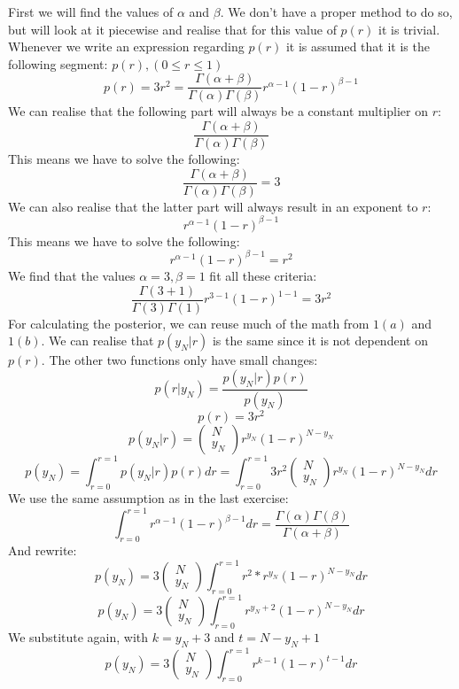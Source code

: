 First we will find the values of $\alpha$ and $\beta$. We don't have a proper method to do so, but will look at it piecewise and realise that for this value of $p(r)$ it is trivial. Whenever we write an expression regarding $p(r)$ it is assumed that it is the following segment: $p(r), (0 \leq r \leq 1)$
$$
p(r) = 3r^2 = \frac{\Gamma(\alpha + \beta)}{\Gamma(\alpha)\Gamma(\beta)} r^{\alpha-1}(1-r)^{\beta-1}
$$
We can realise that the following part will always be a constant multiplier on $r$:
$$
\frac{\Gamma(\alpha + \beta)}{\Gamma(\alpha)\Gamma(\beta)}
$$
This means we have to solve the following:
$$
\frac{\Gamma(\alpha + \beta)}{\Gamma(\alpha)\Gamma(\beta)} = 3
$$
We can also realise that the latter part will always result in an exponent to $r$:
$$
r^{\alpha-1}(1-r)^{\beta-1}
$$
This means we have to solve the following:
$$
r^{\alpha-1}(1-r)^{\beta-1} = r^2
$$
We find that the values $\alpha = 3,\beta = 1$ fit all these criteria:
$$
\frac{\Gamma(3 + 1)}{\Gamma(3)\Gamma(1)} r^{3-1}(1-r)^{1-1} = 3r^2
$$
For calculating the posterior, we can reuse much of the math from $1(a)$ and $1(b)$. We can realise that $p(y_N|r)$ is the same since it is not dependent on $p(r)$. The other two functions only have small changes:
$$
p(r|y_N) = \frac{p(y_N|r)p(r)}{p(y_N)}
$$
$$
p(r) = 3r^2
$$
$$
p(y_N|r) = \begin{pmatrix} N\\ y_N \end{pmatrix} r^{y_N} (1-r)^{N-y_N}
$$
$$
p(y_N) = \int^{r=1}_{r=0} p(y_N|r)p(r)dr = \int^{r=1}_{r=0} 3r^2\begin{pmatrix} N\\ y_N \end{pmatrix} r^{y_N} (1-r)^{N-y_N}dr
$$
We use the same assumption as in the last exercise:
$$
\int^{r=1}_{r=0}r^{\alpha-1}(1-r)^{\beta-1}dr = \frac{\Gamma(\alpha)\Gamma(\beta)}{\Gamma(\alpha + \beta)}
$$
And rewrite:
$$
p(y_N) = 3\begin{pmatrix} N\\ y_N \end{pmatrix} \int^{r=1}_{r=0} r^2 * r^{y_N} (1-r)^{N-y_N}dr
$$
$$
p(y_N) = 3\begin{pmatrix} N\\ y_N \end{pmatrix} \int^{r=1}_{r=0} r^{y_N+2} (1-r)^{N-y_N}dr
$$
We substitute again, with $k = y_N+3$ and $t=N-y_N+1$
$$
p(y_N) = 3\begin{pmatrix} N\\ y_N \end{pmatrix} \int^{r=1}_{r=0} r^{k-1} (1-r)^{t-1}dr
$$

